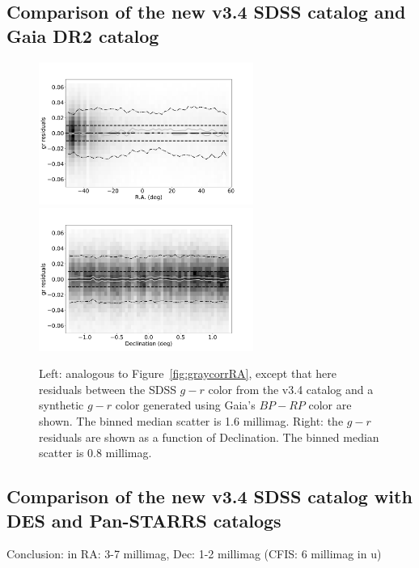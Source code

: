  

\subsection{Comparison of the new v3.4 SDSS catalog and Gaia DR2 catalog \label{sec:SSCvsGaia}} 
  

\begin{figure}
    \centering\includegraphics[width=7cm]{figures/colorResidGaiaColors_gr_RA_Hess.png} 
    \centering\includegraphics[width=7cm]{figures/colorResidGaiaColors_gr_Dec_Hess.png} 
\caption{Left: analogous to Figure~\ref{fig:graycorrRA}, except that here residuals between
the SDSS $g-r$ color from the v3.4 catalog and a synthetic $g-r$ color generated using 
Gaia's $BP-RP$ color are shown. The binned median scatter is 1.6 millimag. Right: the 
$g-r$ residuals are shown as a function of Declination. The binned median scatter is 0.8 millimag.
}
\label{fig:grVSgaiaRADec}
\end{figure}
 

\subsection{Comparison of the new v3.4 SDSS catalog with DES and Pan-STARRS catalogs \label{sec:DESPS1}} 
  
 
Conclusion: in RA: 3-7 millimag, Dec: 1-2 millimag  (CFIS: 6 millimag in u) 


